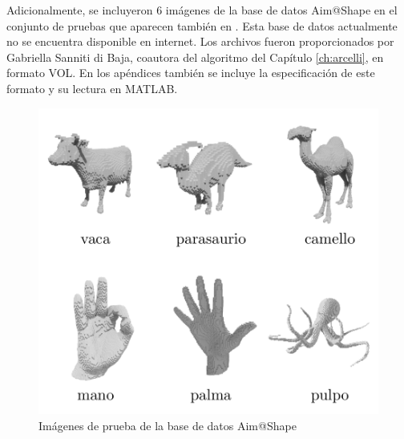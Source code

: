 Adicionalmente, se incluyeron 6 imágenes de la base de datos Aim@Shape en el conjunto de pruebas \cite{saboret2007laurent} que aparecen también en \cite{arcelli2011distance}. Esta base de datos actualmente no se encuentra disponible en internet. Los archivos fueron proporcionados por Gabriella Sanniti di Baja, coautora del algoritmo del Capítulo \ref{ch:arcelli}, en formato VOL. En los apéndices también se incluye la especificación de este formato y su lectura en MATLAB.

\begin{figure}[H]\centering
\includegraphics[width=0.8\linewidth]{images/test_models_aas}
\caption{Imágenes de prueba de la base de datos Aim@Shape}
\label{fig:test_models_aas}
\end{figure}
